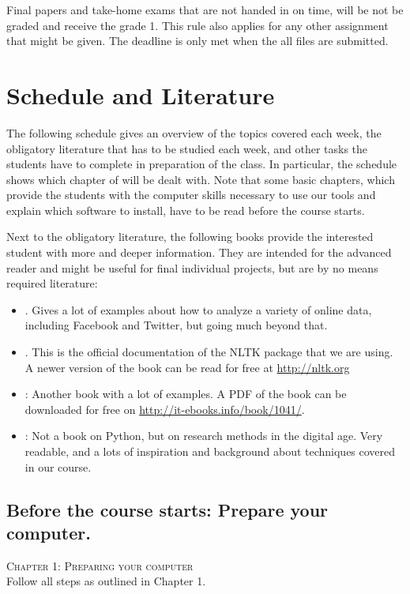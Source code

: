 \documentclass[a4paper,10pt]{report}
\begin{document}
Final papers and take-home exams that are not handed in on time, will be not be graded and receive the grade 1. This rule also applies for any other assignment that might be given. The deadline is only met when the all files are submitted.


 
 
 
\chapter{Schedule and Literature}

The following schedule gives an overview of the topics covered each week, the obligatory literature that has to be studied each week, and other tasks the students have to complete in preparation of the class.
In particular, the schedule shows which chapter of \cite{Trilling2016} will be dealt with. Note that some basic chapters, which provide the students with the computer skills necessary to use our tools and explain which software to install, have to be read before the course starts.

Next to the obligatory literature, the following books provide the interested student with more and deeper information. They are intended for the advanced reader and might be useful for final individual projects, but are by no means required literature:

\begin{itemize}
\item \citealp{Russel2013}. Gives a lot of examples about how to analyze a variety of online data, including Facebook and Twitter, but going much beyond that.
\item \citealp{Bird2009}. This is the official documentation of the NLTK package that we are using. A newer version of the book can be read for free at \url{http://nltk.org}
\item \citealp{McKinney2012}: Another book with a lot of examples. A PDF of the book can be downloaded for free on \url{http://it-ebooks.info/book/1041/}.
\item \citealp{Salganik2017}: Not a book on Python, but on research methods in the digital age. Very readable, and a lots of inspiration and background about techniques covered in our course.
\end{itemize}



\section*{Before the course starts: Prepare your computer.}
\textsc{ Chapter 1: Preparing your computer}\\
Follow all steps as outlined in Chapter 1.
\end{document}
